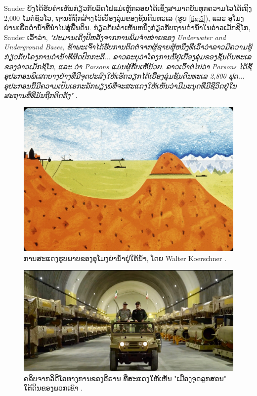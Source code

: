 \documentclass[10pt,twocolumn,letterpaper]{article}
\begin{document}
Sauder ຍັງໄດ້ຮັບຄຳເຫັນກ່ຽວກັບລົດໄຟແມ່ເຫຼັກລອຍໄດ້ເຊິ່ງສາມາດບັນທຸກຄວາມໄວໄດ້ເຖິງ 2,000 ໄມຕໍ່ຊົ່ວໂວ, ຖານທີ່ຖືກສ້າງໄວ້ເບື້ອງລຸ່ມຂອງຊັ້ນດິນທະເລ (ຮູບ \ref{fig:5}), ແລະ ອຸໂມງຍ່ານເຮືອດຳນໍ້າທີ່ນໍາໄປສູ່ພື້ນດິນ. ກ່ຽວກັບຄຳເຫັນຫນຶ່ງກ່ຽວກັບຖານດຳນໍ້າໃນອ່າວເມັກຊິໂກ, Sauder ເວົ້າວ່າ, \textit{"ປະມານເຄິ່ງປີຫລັງຈາກການພິມຈໍາໜ່າຍຂອງ Underwater and Underground Bases, ຂ້າພະເຈົ້າໄດ້ຮັບການຕິດຕໍ່ຈາກຜູ້ຊາຍຜູ້ຫນຶ່ງທີ່ເວົ້າວ່າລາວມີຄວາມຮູ້ກ່ຽວກັບໂຄງການດຳນໍ້າທີ່ຜິດປົກກະຕິ... ລາວລະບຸວ່າໂຄງການນີ້ຢູ່ເບື້ອງລຸ່ມຂອງຊັ້ນດິນທະເລຂອງອ່າວເມັກຊິໂກ, ແລະ ວ່າ Parsons ແມ່ນຜູ້ຮັບເຫັນ້ວຍ. ລາວເວົ້າຕໍ່ໄປວ່າ Parsons ໄດ້ຊື້ອຸປະກອນພິເສດບາງຢ່າງທີ່ມີຈຸດປະສົງໃຫ້ເຮັດວຽກໄດ້ເບື້ອງລຸ່ມຊັ້ນດິນທະເລ 2,800 ຟຸດ... ອຸປະກອນນີ້ມີຄວາມເປັນເອກະລັກພຽງພໍທີ່ຈະສະແດງໃຫ້ເຫັນວ່າມີມະນຸດທີ່ມີຊີວິດຢູ່ໃນສະຖານທີ່ທີ່ມັນຖືກຕິດຕັ້ງ"} \cite{22}.
\begin{figure}[t]
\begin{center}
   \includegraphics[width=1\linewidth]{sub.jpg}
\end{center}
   \caption{ການສະແດງຮູບພາບຂອງອຸໂມງຍ່ານໍ້າຢູ່ໃຕ້ນໍ້າ, ໂດຍ Walter Koerschner \cite{22,23}.}
\label{fig:6}
\label{fig:onecol}
\end{figure}
\begin{figure}[t]
\begin{center}
   \includegraphics[width=1\linewidth]{iran.jpeg}
\end{center}
   \caption{ຄລິບຈາກວິດີໂອທາງການຂອງອີຣານ ທີ່ສະແດງໃຫ້ເຫັນ "ເມືອງຈູດລູກສອນ" ໃຕ້ດິນຂອງພວກເຂົາ \cite{39,40}.}
\label{fig:12}
\label{fig:onecol}
\end{figure}
\end{document}
